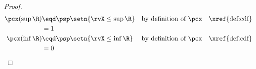 \begin{theorem}
\label{thm:cdf}
\end{theorem}
\begin{proof}
\begin{align*}
  \pcx(\sup\R)
    &\eqd \psp\setn{\rvX\le\sup\R}
    && \text{by definition of $\pcx$}
    &&\text{\xref{def:cdf}}
  \\&=    1
  \\
  \pcx(\inf\R)
    &\eqd \psp\setn{\rvX\le\inf\R}
    && \text{by definition of $\pcx$} &&\text{\xref{def:cdf}}
  \\&=    0
\end{align*}
\end{proof}

